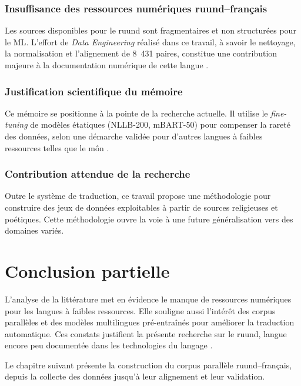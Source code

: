 \subsubsection{Insuffisance des ressources numériques ruund--français}

Les sources disponibles pour le ruund sont fragmentaires et non structurées pour le \ac{ML}. L'effort de \textit{Data Engineering} réalisé dans ce travail, à savoir le nettoyage, la normalisation et l'alignement de 8~431 paires, constitue une contribution majeure à la documentation numérique de cette langue \cite{Mununga2026openruund}.

\subsubsection{Justification scientifique du mémoire}

Ce mémoire se positionne à la pointe de la recherche actuelle. Il utilise le \textit{fine-tuning} de modèles étatiques (NLLB-200, mBART-50) pour compenser la rareté des données, selon une démarche validée pour d'autres langues à faibles ressources telles que le môn \cite{tun2025exploring}.

\subsubsection{Contribution attendue de la recherche}

Outre le système de traduction, ce travail propose une méthodologie pour construire des jeux de données exploitables à partir de sources religieuses et poétiques. Cette méthodologie ouvre la voie à une future généralisation vers des domaines variés.

\section*{Conclusion partielle}

L'analyse de la littérature met en évidence le manque de ressources numériques pour les langues à faibles ressources. Elle souligne aussi l'intérêt des corpus parallèles et des modèles multilingues pré-entraînés pour améliorer la traduction automatique. Ces constats justifient la présente recherche sur le ruund, langue encore peu documentée dans les technologies du langage \cite{ranathunga2023neural, haulai2023construction, kozhirbayev2024enhancing}.

Le chapitre suivant présente la construction du corpus parallèle ruund--français, depuis la collecte des données jusqu'à leur alignement et leur validation.